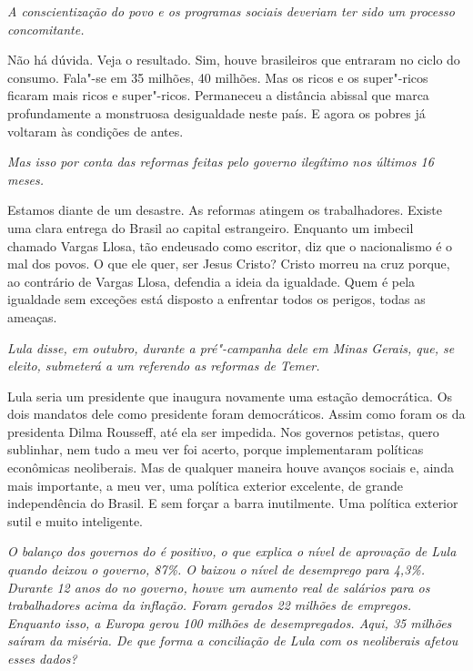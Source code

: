 \itshape
A conscientização do povo e os programas sociais
deveriam ter sido um processo concomitante.

\normalfont 
Não há dúvida. Veja o resultado. Sim, houve brasileiros
que entraram no ciclo do consumo. Fala"-se em 35 milhões, 40 milhões. Mas
os ricos e os super"-ricos ficaram mais ricos e super"-ricos. Permaneceu a
distância abissal que marca profundamente a monstruosa desigualdade
neste país. E agora os pobres já voltaram às condições de antes.

\itshape
Mas isso por conta das reformas feitas pelo governo
ilegítimo nos últimos 16 meses.

\normalfont 
Estamos diante de um desastre. As reformas atingem os
trabalhadores. Existe uma clara entrega do Brasil ao capital
estrangeiro. Enquanto um imbecil chamado Vargas Llosa, tão endeusado
como escritor, diz que o nacionalismo é o mal dos povos. O que ele quer,
ser Jesus Cristo? Cristo morreu na cruz porque, ao contrário de Vargas
Llosa, defendia a ideia da igualdade. Quem é pela igualdade sem exceções
está disposto a enfrentar todos os perigos, todas as ameaças.

\itshape
Lula disse, em outubro, durante a pré"-campanha dele em
Minas Gerais, que, se eleito, submeterá a um referendo as reformas de
Temer.

\normalfont 
Lula seria um presidente que inaugura novamente uma
estação democrática. Os dois mandatos dele como presidente foram
democráticos. Assim como foram os da presidenta Dilma Rousseff, até ela
ser impedida. Nos governos petistas, quero sublinhar, nem tudo a meu ver
foi acerto, porque implementaram políticas econômicas neoliberais. Mas
de qualquer maneira houve avanços sociais e, ainda mais importante, a
meu ver, uma política exterior excelente, de grande independência do
Brasil. E sem forçar a barra inutilmente. Uma política exterior sutil e
muito inteligente.

\itshape
O balanço dos governos do  é positivo, o que explica
o nível de aprovação de Lula quando deixou o governo, 87\%. O  baixou
o nível de desemprego para 4,3\%. Durante 12 anos do  no governo,
houve um aumento real de salários para os trabalhadores acima da
inflação. Foram gerados 22 milhões de empregos. Enquanto isso, a Europa
gerou 100 milhões de desempregados. Aqui, 35 milhões saíram da miséria.
De que forma a conciliação de Lula com os neoliberais afetou esses
dados?

